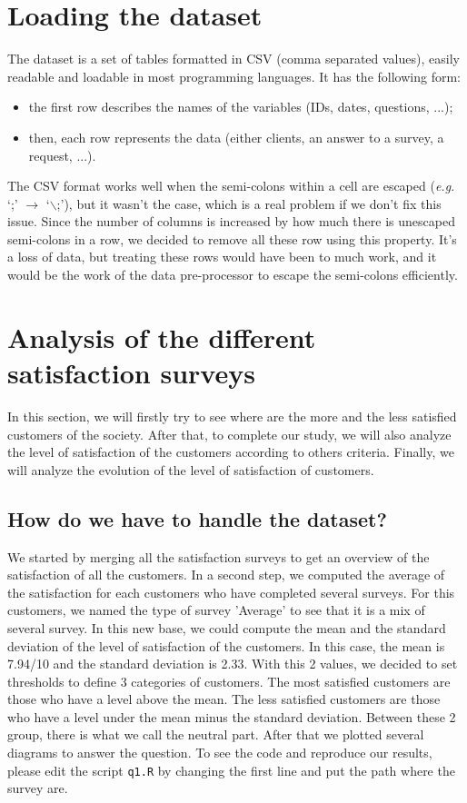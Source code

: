 \documentclass[a4paper, 11pt]{article}
\newcommand{\tw}[1]{\texttt{#1}}
\begin{document}
\section{Loading the dataset}
	The dataset is a set of tables formatted in CSV (comma separated values), easily readable and loadable in most programming languages. It has the following form:
    \begin{itemize}[noitemsep]
    	\item the first row describes the names of the variables (IDs, dates, questions, ...);
        \item then, each row represents the data (either clients, an answer to a survey, a request, ...).
    \end{itemize}
    The CSV format works well when the semi-colons within a cell are escaped (\textit{e.g.} `;' $\rightarrow$ `$\backslash$;'), but it wasn't the case, which is a real problem if we don't fix this issue. Since the number of columns is increased by how much there is unescaped semi-colons in a row, we decided to remove all these row using this property. It's a loss of data, but treating these rows would have been to much work, and it would be the work of the data pre-processor to escape the semi-colons efficiently.

\section{Analysis of the different satisfaction surveys}
	In this section, we will firstly try to see where are the more and the less satisfied customers of the society. After that, to complete our study, we will also analyze the level of satisfaction of the customers according to others criteria. Finally, we will analyze the evolution of the level of satisfaction of customers.
    
    \subsection{How do we have to handle the dataset?}
    We started by merging all the satisfaction surveys to get an overview of the satisfaction of all the customers. In a second step, we computed the average of the satisfaction for each customers who have completed several surveys. For this customers, we named the type of survey 'Average' to see that it is a mix of several survey. In this new base, we could compute the mean and the standard deviation of the level of satisfaction of the customers. In this case, the mean is 7.94/10 and the standard deviation is 2.33. With this 2 values, we decided to set thresholds to define 3 categories of customers. The most satisfied customers are those who have a level above the mean. The less satisfied customers are those who have a level under the mean minus the standard deviation. Between these 2 group, there is what we call the neutral part. After that we plotted several diagrams to answer the question. To see the code and reproduce our results, please edit the script \tw{q1.R} by changing the first line and put the path where the survey are.
    
\end{document}
